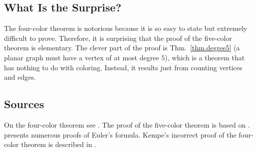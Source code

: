 \begin{figure}[ht]
{
}
\label{f.five-kempe2}
\label{f.five-kempe2-share}
\end{figure}

\clearpage

\subsection*{What Is the Surprise?}

The four-color theorem is notorious because it is so easy to state but extremely difficult to prove. Therefore, it is surprising that the proof of the five-color theorem is elementary. The clever part of the proof is Thm.~\ref{thm.degree5} (a planar graph must have a vertex of at most degree $5$), which is a theorem that has nothing to do with coloring. Instead, it results just from counting vertices and edges.

\subsection*{Sources}
On the four-color theorem see \cite{thomas,wiki:four}. The proof of the five-color theorem is based on \cite{thebook,wiki:five}.
\cite{eppstein} presents numerous proofs of Euler's formula. Kempe's incorrect proof of the four-color theorem is described in \cite{sipka}.
